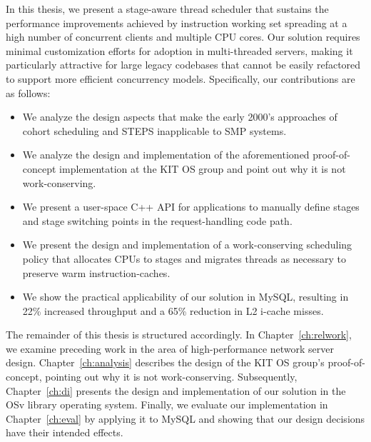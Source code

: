 \documentclass[12pt,a4paper]{book}
\begin{document}
In this thesis, we present a stage-aware thread scheduler that sustains the performance improvements achieved by instruction working set spreading at a high number of concurrent clients and multiple CPU cores.
Our solution requires minimal customization efforts for adoption in multi-threaded servers, making it particularly attractive for large legacy codebases that cannot be easily refactored to support more efficient concurrency models.
Specifically, our contributions are as follows:
\begin{itemize}
    \item We analyze the design aspects that make the early 2000's approaches of cohort scheduling and STEPS inapplicable to SMP systems.
    \item We analyze the design and implementation of the aforementioned proof-of-concept implementation at the KIT OS group and point out why it is not work-conserving.
    \item We present a user-space C++ API for applications to manually define stages and stage switching points in the request-handling code path.
    \item We present the design and implementation of a work-conserving scheduling policy that allocates CPUs to stages and migrates threads as necessary to preserve warm instruction-caches.
    \item We show the practical applicability of our solution in MySQL, resulting in 22\% increased throughput and a 65\% reduction in L2 i-cache misses.
\end{itemize}

The remainder of this thesis is structured accordingly.
In Chapter~\ref{ch:relwork}, we examine preceding work in the area of high-performance network server design.
Chapter~\ref{ch:analysis} describes the design of the KIT OS group's proof-of-concept, pointing out why it is not work-conserving.
Subsequently, Chapter~\ref{ch:di} presents the design and implementation of our solution in the OSv library operating system.
Finally, we evaluate our implementation in Chapter~\ref{ch:eval} by applying it to MySQL and showing that our design decisions have their intended effects.
\end{document}
